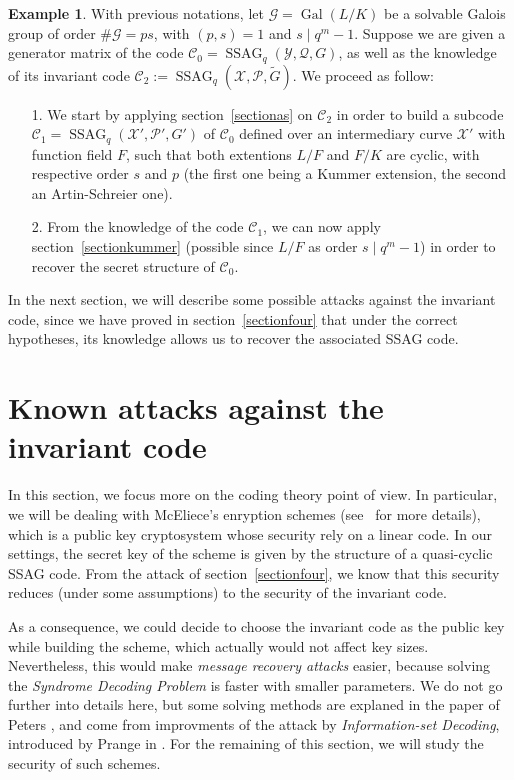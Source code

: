 \documentclass[10pt]{article}
\theoremstyle{definition}
\theoremstyle{definition}
\newtheorem{expl}[thm]{Example}
\theoremstyle{definition}
\newcommand{\C}{\mathcal{C}}
\newcommand{\X}{\mathcal{X}}
\newcommand{\Y}{\mathcal{Y}}
\newcommand{\PR}{\mathcal{P}}
\newcommand{\QR}{\mathcal{Q}}
\newcommand{\G}{\mathcal{G}}
\newcommand{\Gal}{\operatorname{Gal}}
\newcommand{\ssag}{\operatorname{SSAG}}
\begin{document}
\begin{expl} With previous notations, let $\G=\Gal(L/K)$ be a solvable Galois group of order $\#\G = ps$, with $(p,s)=1$ and $s \mid q^m-1$. Suppose we are given a generator matrix of the code $\C_0 = \ssag_q(\Y,\QR,G)$, as well as the knowledge of its invariant code $\C_2 := \ssag_q(\X,\PR,\tilde{G})$. We proceed as follow: 
\begin{enumerate}
\item[1.] We start by applying section~\ref{sectionas} on $\C_2$ in order to build a subcode $\C_1 = \ssag_q(\X',\PR',G')$ of $\C_0$ defined over an intermediary curve $\X'$ with function field $F$, such that both extentions $L/F$ and $F/K$ are cyclic, with respective order $s$ and $p$ (the first one being a Kummer extension, the second an Artin-Schreier one).
\item[2.] From the knowledge of the code $\C_1$, we can now apply section~\ref{sectionkummer} (possible since $L/F$ as order $s \mid q^m-1$) in order to recover the secret structure of $\C_0$.
\end{enumerate}
\end{expl}

In the next section, we will describe some possible attacks against the invariant code, since we have proved in section~\ref{sectionfour} that under the correct hypotheses, its knowledge allows us to recover the associated SSAG code.


\section{Known attacks against the invariant code} \label{section6}


In this section, we focus more on the coding theory point of view. In particular, we will be dealing with McEliece's enryption schemes (see~\cite{McE} for more details), which is a public key cryptosystem whose security rely on a linear code. In our settings, the secret key of the scheme is given by the structure of a quasi-cyclic SSAG code. From the attack of section~\ref{sectionfour}, we know that this security reduces (under some assumptions) to the security of the invariant code. 



 As a consequence, we could decide to choose the invariant code as the public key while building the scheme, which actually would not affect key sizes. Nevertheless, this would make \textit{message recovery attacks} easier, because solving the \textit{Syndrome Decoding Problem} is faster with smaller parameters. We do not go further into details here, but some solving methods are explaned in the paper of Peters \cite{PET}, and come from improvments of the attack by \textit{Information-set Decoding}, introduced by Prange in \cite{PR62}. For the remaining of this section, we will study the security of such schemes.
\end{document}
